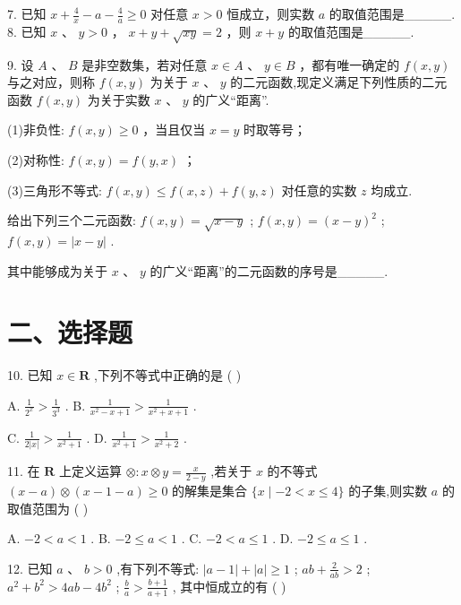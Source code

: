 7. 已知 $x + \frac{4}{x} - a - \frac{4}{a} \geq  0$ 对任意 $x > 0$ 恒成立，则实数 $a$ 的取值范围是\_\_\_\_\_. 8. 已知 $x$ 、 $y > 0$ ， $x + y + \sqrt{xy} = 2$ ，则 $x + y$ 的取值范围是\_\_\_\_\_.

9. 设 $A$ 、 $B$ 是非空数集，若对任意 $x \in  A$ 、 $y \in  B$ ，都有唯一确定的 $f\left( {x,y}\right)$ 与之对应，则称 $f\left( {x,y}\right)$ 为关于 $x\text{ 、 }y$ 的二元函数,现定义满足下列性质的二元函数 $f\left( {x,y}\right)$ 为关于实数 $x\text{ 、 }y$ 的广义“距离”.

(1)非负性: $f\left( {x,y}\right)  \geq  0$ ，当且仅当 $x = y$ 时取等号；

(2)对称性: $f\left( {x,y}\right)  = f\left( {y,x}\right)$ ；

(3)三角形不等式: $f\left( {x,y}\right)  \leq  f\left( {x,z}\right)  + f\left( {y,z}\right)$ 对任意的实数 $z$ 均成立.

给出下列三个二元函数:   $f\left( {x,y}\right)  = \sqrt{x - y}$ ;    $f\left( {x,y}\right)  = {\left( x - y\right) }^{2}$ ;    $f\left( {x,y}\right)  = \left| {x - y}\right|$ .

其中能够成为关于 $x$ 、 $y$ 的广义“距离”的二元函数的序号是\_\_\_\_\_.

\section*{二、选择题}

10. 已知 $x \in  \mathbf{R}$ ,下列不等式中正确的是 ( )

A. $\frac{1}{{2}^{x}} > \frac{1}{{3}^{3}}$ . B. $\frac{1}{{x}^{2} - x + 1} > \frac{1}{{x}^{2} + x + 1}$ .

C. $\frac{1}{2\left| x\right| } > \frac{1}{{x}^{2} + 1}$ . D. $\frac{1}{{x}^{2} + 1} > \frac{1}{{x}^{2} + 2}$ .

11. 在 $\mathbf{R}$ 上定义运算 $\otimes   : x \otimes  y = \frac{x}{2 - y}$ ,若关于 $x$ 的不等式 $\left( {x - a}\right)  \otimes  \left( {x - 1 - a}\right)  \geq  0$ 的解集是集合 $\{ x \mid   - 2 < x \leq  4\}$ 的子集,则实数 $a$ 的取值范围为 ( )

A. $- 2 < a < 1$ . B. $- 2 \leq  a < 1$ . C. $- 2 < a \leq  1$ . D. $- 2 \leq  a \leq  1$ .

12. 已知 $a\text{ 、 }b > 0$ ,有下列不等式:    $\left| {a - 1}\right|  + \left| a\right|  \geq  1$ ;    ${ab} + \frac{2}{ab} > 2$ ;    ${a}^{2} + {b}^{2} > {4ab} - 4{b}^{2}$ ;    $\frac{b}{a} > \frac{b + 1}{a + 1}$ , 其中恒成立的有 ( )

